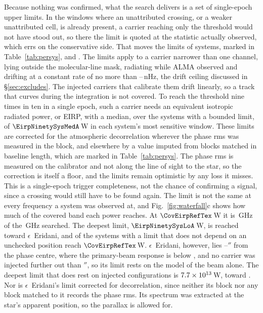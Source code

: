 Because nothing was confirmed, what the search delivers is a set of
single-epoch upper limits. In the \XwNWin{} windows where an unattributed
crossing, or a weaker unattributed cell, is already present, a carrier
reaching only the threshold would not have stood out, so there the limit is
quoted at the statistic actually observed, which errs on the conservative
side. That moves the limits of \XwNSysWord{} systems, marked in
Table~\ref{tab:persys}, and \XwHeadlineClause. The limits apply to a
carrier narrower than one channel, lying outside the molecular-line mask,
radiating while ALMA observed and drifting at a constant rate of no more
than \DriftCeilLo--\DriftCeilHi\,nHz, the drift ceiling discussed in
\S\ref{sec:excludes}. The injected carriers that calibrate them drift
linearly, so a track that curves during the integration is not covered.
To reach the threshold nine times in ten in a single epoch, such a carrier needs an equivalent isotropic radiated power, or EIRP,
with a median, over the \NSysALimSum{} systems with a bounded limit, of
$\EirpNinetySysMedA$\,W in each system's most sensitive window. These limits
are corrected for the atmospheric decorrelation wherever the phase rms was
measured in the block, and elsewhere by a value imputed from blocks matched in
baseline length, which are marked in Table~\ref{tab:persys}. The phase rms is
measured on the calibrator and not along the line of sight to the star, so
the correction is itself a floor, and the limits remain optimistic by any
loss it misses. This is a single-epoch trigger completeness, not the
chance of confirming a signal, since a crossing would still have to be found
again. The limit is not the same at every frequency a system was observed
at, and Fig.~\ref{fig:waterfall}c shows how much of the covered band each
power reaches. At $\CovEirpRefTex$\,W it is \CovUnionAtRef\,GHz of the
\CvUnionA\,GHz searched. The deepest limit, $\EirpNinetySysLoA$\,W, is reached toward
$\epsilon$~Eridani, and \NSysEfifteen{} of the \NSysALimSum{} systems with a
limit that does not depend on an unchecked position reach
$\CovEirpRefTex$\,W. $\epsilon$~Eridani, however, lies
\EdDeepOffLo--\EdDeepOffHi$''$ from the phase centre, where the primary-beam
response is below \OffAcut, and no carrier was injected further out than
\OffInjMaxArcsec$''$, so its limit rests on the model of the beam alone. The deepest limit that does rest on injected
configurations is $7.7\times10^{13}$\,W, toward \PtDeepInjStar. Nor is
$\epsilon$~Eridani's limit corrected for decorrelation, since neither its block
nor any block matched to it records the phase rms. Its spectrum was extracted at
the star's apparent position, so the parallax is allowed for.

